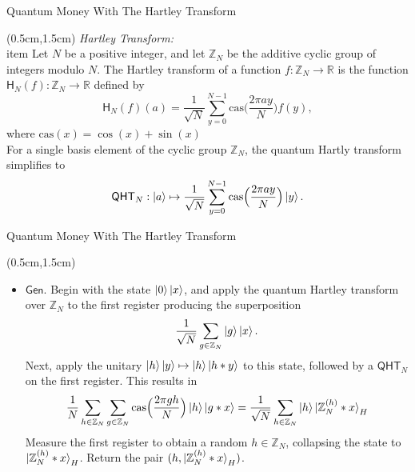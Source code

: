 \documentclass{beamer}
\theoremstyle{definition}
\newcommand{\cas}{\mathrm{cas}}
\newcommand{\cht}{\mathsf{H}}
\newcommand{\qht}{\mathsf{QHT}}
\newcommand{\gen}{\mathsf{Gen}}
\begin{document}
\begin{frame}{Quantum Money With The Hartley Transform}
    
    \begin{textblock*}{12cm}(0.5cm,1.5cm)
        \textit{Hartley Transform:}\\
        item Let $N$ be a positive integer, and let $\mathbb{Z}_N$ be the additive cyclic group of integers modulo $N$. The Hartley transform of a function $f: \mathbb{Z}_N \to \mathbb{R}$ is the function $\cht_N(f): \mathbb{Z}_N \to \mathbb{R}$ defined by
        \[ \cht_N(f)(a) = \frac{1}{\sqrt{N}} \sum_{y = 0}^{N - 1} \cas\Big(\frac{2 \pi ay}{N}\Big) f(y),  \]
        where $\cas(x) = \cos(x) + \sin(x)$ \\
        For a single basis element of the cyclic group $\mathbb{Z}_N$, the quantum Hartly transform simplifies to
        \begin{equation}
            \label{eq:qht-N}
            \qht_N: \ket{a} \mapsto \frac{1}{\sqrt{N}} \sum_{y = 0}^{N - 1} \cas\Big(\frac{2\pi a y}{N}\Big) \ket{y}.
        \end{equation}
    \end{textblock*}
    

\end{frame}






\begin{frame}{Quantum Money With The Hartley Transform}
    
    \begin{textblock*}{12cm}(0.5cm,1.5cm)
            
        
       
        \begin{itemize}
            \item $\gen$. Begin with the state $\ket{0}\ket{x}$, and apply the quantum Hartley transform over $\mathbb{Z}_N$ to the first register producing the superposition
            \[ \frac{1}{\sqrt{N}} \sum_{g \in \mathbb{Z}_N} \ket{g}\ket{x}. \]
            Next, apply the unitary $\ket{h}\ket{y} \mapsto \ket{h}\ket{h * y}$ to this state, followed by a $\qht_N$ on the first register. This results in
            \[ \frac{1}{N} \sum_{h \in \mathbb{Z}_N} \sum_{g \in \mathbb{Z}_N} \cas\Big(\frac{2\pi gh}{N}\Big) \ket{h}\ket{g * x} = \frac{1}{\sqrt{N}} \sum_{h \in \mathbb{Z}_N} \ket{h} \ket{\mathbb{Z}_N^{(h)} * x}_H \]
            Measure the first register to obtain a random $h \in \mathbb{Z}_N$, collapsing the state to $\ket{\mathbb{Z}_N^{(h)} * x}_H$. Return the pair $(h, \ket{\mathbb{Z}_N^{(h)} * x}_H)$.

        \end{itemize}
        
       
        
    \end{textblock*}


\end{frame}
\end{document}
